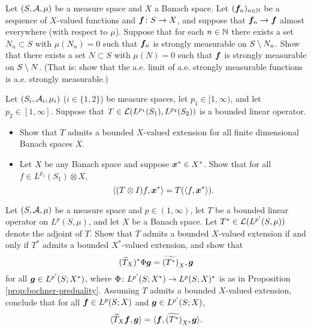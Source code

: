 \begin{exercise}\label{ex:sm-limits}
  Let $(S,\mathcal{A},\mu)$ be a measure space and $X$ a Banach space.
  Let $(\bm{f}_{n})_{n \in \mathbb{N}}$ be a sequence of $X$-valued functions and $\bm{f} \colon S \rightarrow X$, and suppose that $\bm{f}_{n} \to \bm{f}$ almost everywhere (with respect to $\mu$).
  Suppose that for each $n \in \mathbb{N}$ there exists a set $N_{n} \subset S$ with $\mu(N_{n}) = 0$ such that $\bm{f}_{n}$ is strongly measurable on $S \setminus N_{n}$.
  Show that there exists a set $N \subset S$ with $\mu(N) = 0$ such that $\bm{f}$ is strongly measurable on $S \setminus N$.
  (That is: show that the a.e. limit of a.e. strongly measurable functions is a.e. strongly measurable.)
\end{exercise}

\begin{exercise}\label{ex:tensor-extension-basic-props}
  Let $(S_i, \mathcal{A}_i, \mu_i)$ ($i \in \{1,2\}$) be measure spaces, let $p_1 \in [1,\infty)$, and let $p_2 \in [1,\infty]$.
  Suppose that $T \in \mathcal{L}(L^{p_1}(S_1), L^{p_2}(S_2))$ is a bounded linear operator.
  \begin{itemize}
  \item
    Show that $T$ admits a bounded $X$-valued extension for all finite dimensional Banach spaces $X$.
  \item
    Let $X$ be any Banach space and suppose $\bm{x}^* \in X^*$.
    Show that for all $f \in L^{p_1}(S_1) \otimes X$,
    \begin{equation*}
      \langle (T \otimes I)f, \bm{x}^* \rangle = T(\langle f, \bm{x}^* \rangle).
    \end{equation*}
  \end{itemize}

\end{exercise}

\begin{exercise}\label{ex:tensor-adjoint}
  Let $(S,\mathcal{A},\mu)$ be a measure space and $p \in (1,\infty)$, let $T$ be a bounded linear operator on $L^p(S,\mu)$, and let $X$ be a Banach space.
  Let $T^*  \in \mathcal{L}(L^{p'}(S,\mu))$ denote the adjoint of $T$.
  Show that $T$ admits a bounded $X$-valued extension if and only if $T^*$ admits a bounded $X^*$-valued extension, and show that
  \begin{equation*}
    (\widetilde{T}_X)^* \Phi \bm{g} = \widetilde{(T^*)}_{X^*} \bm{g}
  \end{equation*}
  for all $\bm{g} \in L^{p'}(S;X^*)$, where $\Phi \colon L^{p'}(S;X^*) \rightarrow L^p(S;X)^*$ is as in Proposition \ref{prop:bochner-preduality}.
  Assuming $T$ admits a bounded $X$-valued extension, conclude that for all $\bm{f} \in L^p(S;X)$ and $\bm{g} \in L^{p'}(S;X)$,
  \begin{equation}\label{eq:tensor-adjoint-identity}
    \langle \widetilde{T}_X \bm{f}, \bm{g} \rangle = \langle \bm{f}, \widetilde{(T^*)}_{X^*} \bm{g} \rangle.
  \end{equation}
\end{exercise}

